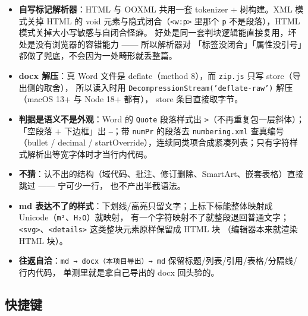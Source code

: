 \documentclass[11pt,a4paper]{ctexart}
\begin{document}
\begin{itemize}
\item \textbf{自写标记解析器}：HTML 与 OOXML 共用一套 tokenizer + 树构建。XML 模式关掉 HTML 的
void 元素与隐式闭合（\texttt{\textless{}w:p\textgreater{}} 里那个 \texttt{p} 不是段落），HTML 模式关掉大小写敏感与自闭合怪癖。
好处是同一套判块逻辑能直接复用，坏处是没有浏览器的容错能力 —— 所以解析器对
「标签没闭合」「属性没引号」都做了兜底，不会因为一处畸形就丢整篇。
\item \textbf{docx 解压}：真 Word 文件是 deflate（method 8），而 \texttt{zip.js} 只写 store（导出侧的取舍），
所以读入时用 \texttt{DecompressionStream('deflate-raw')} 解压（macOS 13+ 与 Node 18+ 都有），
store 条目直接取字节。
\item \textbf{判据是语义不是外观}：Word 的 \texttt{Quote} 段落样式出 \texttt{\textgreater{}}（不再重复包一层斜体）；
「空段落 + 下边框」出 \texttt{---}；带 \texttt{numPr} 的段落去 \texttt{numbering.xml} 查真编号（bullet / decimal /
startOverride），连续同类项合成紧凑列表；只有字符样式解析出等宽字体时才当行内代码。
\item \textbf{不猜}：认不出的结构（域代码、批注、修订删除、SmartArt、嵌套表格）直接跳过 —— 宁可少一行，
也不产出半截语法。
\item \textbf{md 表达不了的样式}：下划线/高亮只留文字；上标下标能整体映射成 Unicode（\texttt{m²}、\texttt{H₂O}）就映射，
有一个字符映射不了就整段退回普通文字；\texttt{\textless{}svg\textgreater{}}、\texttt{\textless{}details\textgreater{}} 这类整块元素原样保留成 HTML 块
（编辑器本来就渲染 HTML 块）。
\item \textbf{往返自洽}：\texttt{md → docx（本项目导出）→ md} 保留标题/列表/引用/表格/分隔线/行内代码，
单测里就是拿自己导出的 docx 回头验的。
\end{itemize}


\subsection{快捷键}
\end{document}
